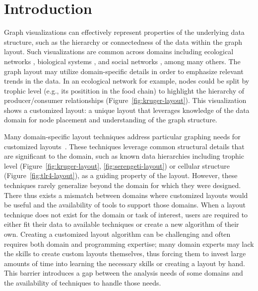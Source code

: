 \section{Introduction}
Graph visualizations can effectively represent properties of the underlying
data structure, such as the hierarchy or connectedness of the data within
the graph layout. Such visualizations are common across domains including
ecological networks
\cite{hinke2004visualizing,harper2006dynamic,lavigne1996cod,baskerville2011spatial,yodzis1998local,cohen2003ecological,kearney2016blog,benson2016higher,kruger2017},
biological systems
\cite{barsky2008cerebral,shannon2003cytoscape,gehlenborg2010visualization,saraiya2005visualizing,becker2001graph},
and social networks \cite{rothenberg1998using} , among many others. The graph layout may utilize
domain-specific details in order to emphasize relevant trends in the
data. In an ecological network for example, nodes could be split by trophic
level (e.g., its positition in the food chain) to highlight the hierarchy
of producer/consumer relationships
(Figure~\ref{fig:kruger-layout}). This visualization shows a customized
layout: a unique layout that leverages knowledge of the data domain for
node placement and understanding of the graph structure.

Many domain-specific layout techniques address particular graphing needs
for customized layouts~\cite{barsky2008cerebral,shannon2003cytoscape,kearney2017d3,kearney2017ecopath}. These
techniques leverage common structural details that are significant to the
domain, such as known data hierarchies including trophic level
(Figure~\ref{fig:kruger-layout}, \ref{fig:serengeti-layout}) or cellular 
structure (Figure~\ref{fig:tlr4-layout}), as a guiding property of the
layout. However, these techniques rarely generalize beyond the domain for
which they were designed. There thus exists a mismatch between domains
where customized layouts would be useful and the availability of tools to
support those domains. When a layout technique does not exist for the
domain or task of interest, users are required to either fit their data
to available techniques or create a new algorithm of their own. Creating a
customized layout algorithm can be \krugerLayout
challenging and often requires both
domain and programming expertise; many domain
experts may lack the skills to create custom layouts themselves, thus
forcing them to invest large amounts of time into learning the necessary
skills or creating a layout by hand. This barrier introduces a gap between
the analysis needs of some domains and the availability of techniques to
handle those needs.

